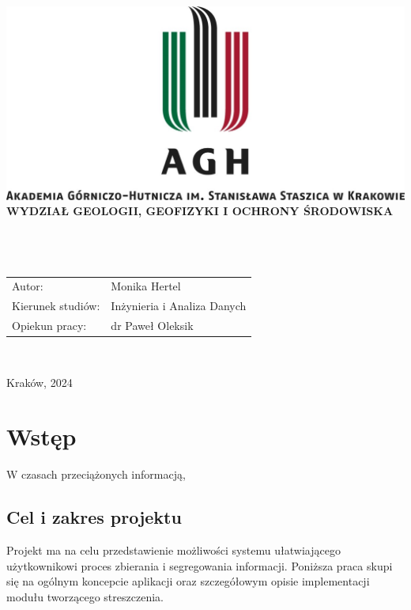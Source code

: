 \documentclass[12pt,a4paper,twoside]{article}
\begin{document}
\thispagestyle{empty}
\begin{center}
\includegraphics[width=\textwidth]{img/logo_AGH.jpg}\\
{\bf{\sf WYDZIAŁ GEOLOGII, GEOFIZYKI I OCHRONY ŚRODOWISKA}}\\[5mm]
{\bf{}}\\[14mm]

{}\\[12mm] 
{}\\[40mm]
\end{center}
{\sf\begin{tabular}{ll}
	Autor: & Monika Hertel\\
	Kierunek studiów: & Inżynieria i Analiza Danych\\
	Opiekun pracy: & dr Paweł Oleksik\\
\end{tabular}}\\[10mm]
\begin{center}
{\sf Kraków, 2024}
\end{center}
\newpage
\tableofcontents
\newpage
\section*{Wstęp}
W czasach przeciążonych informacją, 
\subsection*{Cel i zakres projektu}
Projekt ma na celu przedstawienie możliwości systemu ułatwiającego użytkownikowi proces zbierania i segregowania informacji. Poniższa praca skupi się na ogólnym koncepcie aplikacji oraz szczegółowym opisie implementacji modułu tworzącego streszczenia.
\newpage
\end{document}
